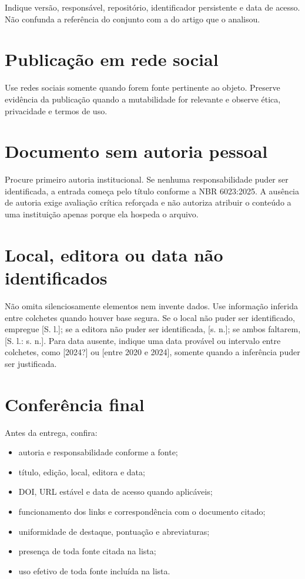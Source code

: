 Indique versão, responsável, repositório, identificador persistente e data de acesso. Não confunda a referência do conjunto com a do artigo que o analisou.

\section{Publicação em rede social}


Use redes sociais somente quando forem fonte pertinente ao objeto. Preserve evidência da publicação quando a mutabilidade for relevante e observe ética, privacidade e termos de uso.

\section{Documento sem autoria pessoal}

Procure primeiro autoria institucional. Se nenhuma responsabilidade puder ser identificada, a entrada começa pelo título conforme a NBR 6023:2025. A ausência de autoria exige avaliação crítica reforçada e não autoriza atribuir o conteúdo a uma instituição apenas porque ela hospeda o arquivo.

\section{Local, editora ou data não identificados}

Não omita silenciosamente elementos nem invente dados. Use informação inferida entre colchetes quando houver base segura. Se o local não puder ser identificado, empregue [S. l.]; se a editora não puder ser identificada, [s. n.]; se ambos faltarem, [S. l.: s. n.]. Para data ausente, indique uma data provável ou intervalo entre colchetes, como [2024?] ou [entre 2020 e 2024], somente quando a inferência puder ser justificada.

\section{Conferência final}

Antes da entrega, confira:

\begin{itemize}
  \item autoria e responsabilidade conforme a fonte;
  \item título, edição, local, editora e data;
  \item DOI, URL estável e data de acesso quando aplicáveis;
  \item funcionamento dos links e correspondência com o documento citado;
  \item uniformidade de destaque, pontuação e abreviaturas;
  \item presença de toda fonte citada na lista;
  \item uso efetivo de toda fonte incluída na lista.
\end{itemize}
